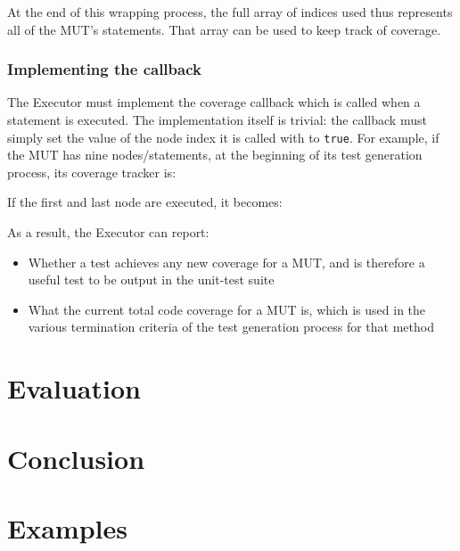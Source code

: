 At the end of this wrapping process, the full array of indices used thus represents all of the MUT's statements. That array can be used to keep track of coverage.

\subsection{Implementing the callback}
The \textsf{Executor} must implement the coverage callback which is called when a statement is executed. The implementation itself is trivial: the callback must simply set the value of the node index it is called with to \texttt{true}. For example, if the MUT has nine nodes/statements, at the beginning of its test generation process, its coverage tracker is:

\begin{code}
\end{code}

\noindent If the first and last node are executed, it becomes:

\begin{code}
\end{code}

As a result, the \textsf{Executor} can report:

\begin{itemize}
   \item Whether a test achieves any new coverage for a MUT, and is therefore a useful test to be output in the unit-test suite
   \item What the current total code coverage for a MUT is, which is used in the various termination criteria of the test generation process for that method
\end{itemize}


\chapter{Evaluation}
\chapter{Conclusion}

\appendix
\chapter{Examples}